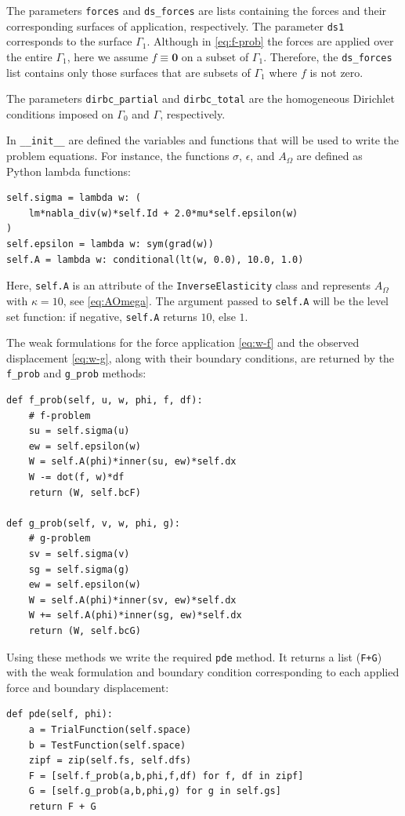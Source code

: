 \documentclass[preprint,9pt]{elsarticle}
\begin{document}
The parameters \texttt{forces} and \texttt{ds\_forces} are lists
containing the forces and their corresponding surfaces of application, respectively.
The parameter \texttt{ds1} corresponds to the surface $\Gamma_1$.
Although in \eqref{eq:f-prob} the forces are applied over the entire $\Gamma_1$,
here we assume $f\equiv\textbf{0}$ on a subset of $\Gamma_1$.
Therefore, the \texttt{ds\_forces} list contains only those surfaces
that are subsets of $\Gamma_1$ where $f$ is not zero.

The parameters \texttt{dirbc\_partial} and \texttt{dirbc\_total} are
the homogeneous Dirichlet conditions imposed on $\Gamma_0$ and $\Gamma$,
respectively.

In \texttt{\_\_init\_\_} are defined the variables and functions
that will be used to write the problem equations.
For instance, the functions $\sigma$, $\epsilon$, and $A_\Omega$
are defined as Python lambda functions:
\begin{lstlisting}
self.sigma = lambda w: (
	lm*nabla_div(w)*self.Id + 2.0*mu*self.epsilon(w)
)
self.epsilon = lambda w: sym(grad(w))
self.A = lambda w: conditional(lt(w, 0.0), 10.0, 1.0)
\end{lstlisting}
Here, \texttt{self.A} is an attribute of the \texttt{InverseElasticity} class
and represents $A_\Omega$ with $\kappa = 10$, see \eqref{eq:AOmega}.
The argument passed to \texttt{self.A} will be the level set function:
if negative, \texttt{self.A} returns $10$, else $1$.

The weak formulations for the force application \eqref{eq:w-f} and
the observed displacement \eqref{eq:w-g},
along with their boundary conditions, are returned
by the \texttt{f\_prob} and \texttt{g\_prob} methods:
\begin{lstlisting}
def f_prob(self, u, w, phi, f, df):
	# f-problem
	su = self.sigma(u)
	ew = self.epsilon(w)
	W = self.A(phi)*inner(su, ew)*self.dx
	W -= dot(f, w)*df
	return (W, self.bcF)

def g_prob(self, v, w, phi, g):
	# g-problem
	sv = self.sigma(v)
	sg = self.sigma(g)
	ew = self.epsilon(w)
	W = self.A(phi)*inner(sv, ew)*self.dx
	W += self.A(phi)*inner(sg, ew)*self.dx
	return (W, self.bcG)
\end{lstlisting}

Using these methods we write the required \texttt{pde} method.
It returns a list (\texttt{F+G}) with the weak formulation
and boundary condition corresponding
to each applied force and boundary displacement:
\begin{lstlisting}
def pde(self, phi):
	a = TrialFunction(self.space)
	b = TestFunction(self.space)
	zipf = zip(self.fs, self.dfs)
	F = [self.f_prob(a,b,phi,f,df) for f, df in zipf]
	G = [self.g_prob(a,b,phi,g) for g in self.gs]
	return F + G
\end{lstlisting}
\end{document}
